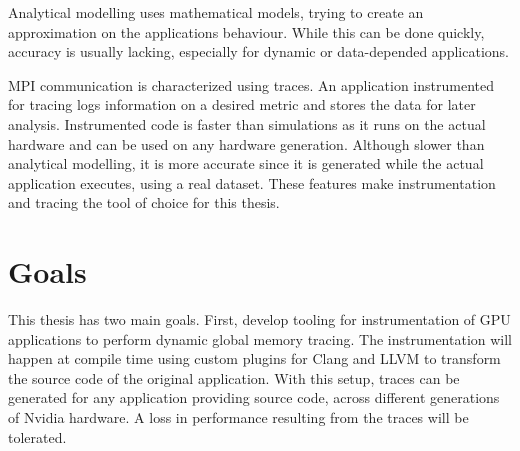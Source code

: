 Analytical modelling uses mathematical models, trying to create an approximation on the applications behaviour.
While this can be done quickly, accuracy is usually lacking, especially for dynamic or data-depended applications.

MPI communication is characterized using traces. An application instrumented for tracing logs information on a desired metric and stores the data for later analysis. Instrumented code is faster than simulations as it runs on the actual hardware and can be used on any hardware generation. Although slower than analytical modelling, it is more accurate since it is generated while the actual application executes, using a real dataset.
These features make instrumentation and tracing the tool of choice for this thesis.


%	
\section{Goals}
This thesis has two main goals. First, develop tooling for instrumentation of GPU applications to perform dynamic global memory tracing. The instrumentation will happen at compile time using custom plugins for Clang and LLVM to transform the source code of the
original application. With this setup, traces can be generated for any application providing source code,
across different generations of Nvidia hardware. A loss in performance resulting from the traces will be tolerated.

